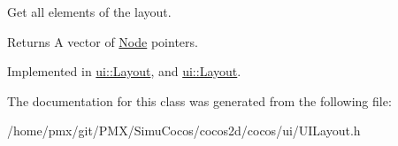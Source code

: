 Get all elements of the layout. 

\begin{DoxyReturn}{Returns}
A vector of \hyperlink{classNode}{Node} pointers. 
\end{DoxyReturn}


Implemented in \hyperlink{classui_1_1Layout_ab80ee89eff7fa311e237e63d72bb18c7}{ui\+::\+Layout}, and \hyperlink{classui_1_1Layout_a832b7950870e62e045456b7565db924d}{ui\+::\+Layout}.



The documentation for this class was generated from the following file\+:\begin{DoxyCompactItemize}
\item 
/home/pmx/git/\+P\+M\+X/\+Simu\+Cocos/cocos2d/cocos/ui/U\+I\+Layout.\+h\end{DoxyCompactItemize}
